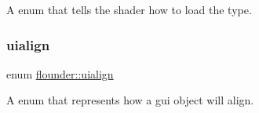 A enum that tells the shader how to load the type. 

\mbox{\label{namespaceflounder_a70f1871d5c05aa8e078dd37501ce10a9}} 
\subsubsection{\texorpdfstring{uialign}{uialign}}
{\footnotesize\ttfamily enum \hyperlink{namespaceflounder_a70f1871d5c05aa8e078dd37501ce10a9}{flounder\+::uialign}}



A enum that represents how a gui object will align. 

